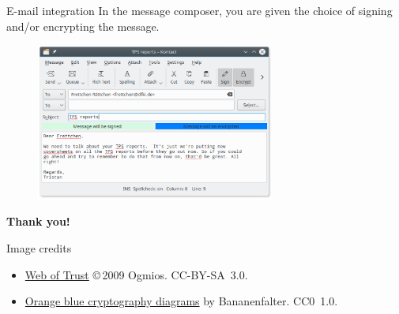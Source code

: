 \documentclass[%
mode=present,%
paper=smartboard,
size=20pt,
]{powerdot}
\begin{document}
\begin{slide}[toc=]{E-mail integration}
  In the message composer, you are given the choice of signing and/or
  encrypting the message.
  \begin{figure}[H]
    \centering
    \includegraphics[width=0.7\textwidth]{images/kmail_send.eps}
    \label{fig:kmail_send}
  \end{figure}
\end{slide}

\begin{slide}[toc=]{}
\centering

\vfill

{\huge \textbf{Thank you!}}

\vfill

\mbox{}
\end{slide}

\begin{slide}[toc=]{Image credits}

  \begin{itemize}
  \item \href{https://commons.wikimedia.org/wiki/File:Web_of_Trust.svg}{Web of Trust} \copyright\,2009 Ogmios. CC-BY-SA~3.0.
  \item \href{https://commons.wikimedia.org/wiki/Category:Orange_blue_cryptography_diagrams}{Orange blue cryptography diagrams} by Bananenfalter. CC0~1.0.
  \end{itemize}

\end{slide}
\end{document}
